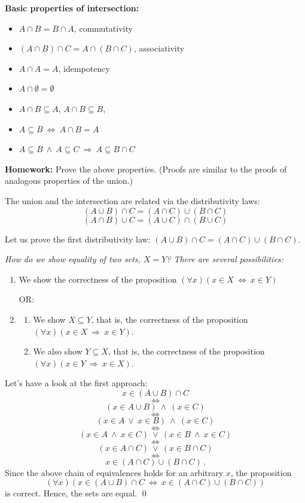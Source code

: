 \documentclass[11pt,paper=b5,footinclude,headinclude]{scrbook} %
\def\ali {{~\vee~}}
\def\inn {{~\wedge~}}
\def\sledi {{~\Rightarrow~}}
\def\cee {{~\Leftrightarrow~}}
\theoremstyle{remark}
\theoremstyle{definition} %
\theoremstyle{theorem} %
\begin{document}
\bigskip
\textbf{ Basic properties of intersection:}
\begin{itemize}
  \item $A\cap B = B\cap A$, commutativity
  \item $(A\cap B)\cap C = A\cap (B\cap C)$, associativity
  \item $A\cap A = A$, idempotency
  \item $A\cap \emptyset = \emptyset$
  \item $A\cap B\subseteq A$, $A\cap B\subseteq B$,
  \item $A\subseteq B\cee A\cap B = A$
  \item $A\subseteq B\inn A\subseteq C\sledi A \subseteq B\cap C$
\end{itemize}

\bigskip
\textbf{ Homework:} Prove the above properties. (Proofs are similar to the proofs of analogous properties of the union.)

\bigskip
The union and the intersection are related via the distributivity laws:
$$(A\cup B)\cap C = (A\cap C)\cup (B\cap C)$$
$$(A\cap B)\cup C = (A\cup C)\cap (B\cup C)$$

Let us prove the first distributivity law:
$(A\cup B)\cap C = (A\cap C)\cup (B\cap C)$.

{\em How do we show equality of two sets, $X = Y$? There are several possibilities:
\begin{enumerate}
  \item We show the correctness of the proposition $(\forall x)(x\in X\cee x\in Y)$

  OR:
  \item

  \begin{enumerate}
          \item   We show $X\subseteq Y$, that is, the correctness of the proposition $(\forall x)(x\in X\sledi x\in Y)$.
          \item   We also show $Y\subseteq X$, that is, the correctness of the proposition $(\forall x)(x\in Y\sledi x\in X)$.
        \end{enumerate}
\end{enumerate}}
Let's have a look at the first approach:
$$x\in (A\cup B)\cap C$$
$$\cee$$
$$(x\in A\cup B) \inn (x\in C)$$
$$\cee$$
$$(x\in A\ali x\in B) \inn (x\in C)$$
$$\cee$$
$$(x\in A \inn  x\in C)\ali (x\in B \inn  x\in C) $$
$$\cee$$
$$(x\in A \cap C)\ali (x\in B \cap C) $$
$$\cee$$
$$x\in (A \cap C)\cup (B \cap C)\,.$$
Since the above chain of equivalences holds for an arbitrary $x$, the proposition
$$(\forall x)(x\in (A\cup B)\cap C\cee x\in (A \cap C)\cup (B \cap C))$$
is correct. Hence, the sets are equal.
\qed
\end{document}
